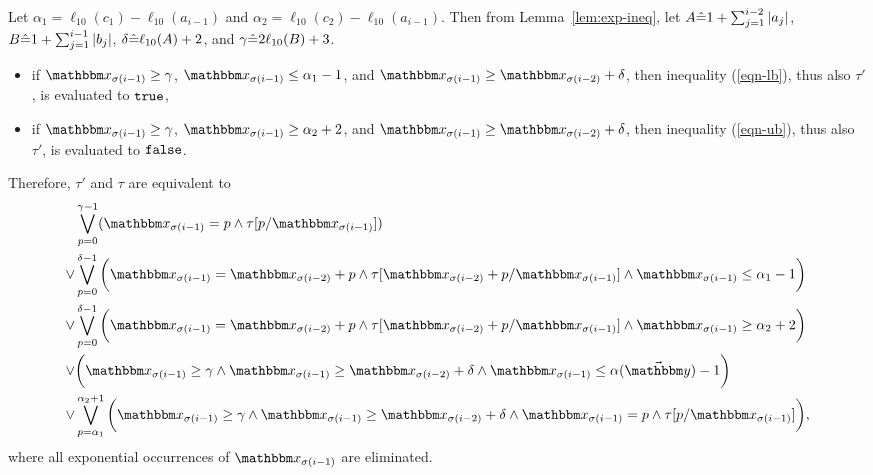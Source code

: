 Let $\alpha_1 = \ell_{10}(c_1) -  \ell_{10}(a_{i-1})$ and $\alpha_2 = \ell_{10}(c_2) -  \ell_{10}(a_{i-1})$. Then from Lemma~\ref{lem:exp-ineq}, let $A\hat{=} 1+\sum_{j=1}^{i-2}\vert a_j\vert$, 
$B \hat{=} 1+\sum_{j=1}^{i-1}\vert b_j\vert$, 
$\delta\hat{=}  \ell_{10}(A)+2$,
and $\gamma \hat{=} 2\ell_{10}(B)+3$. 
\begin{itemize}
\item if $\ivarx_{\sigma(i-1)} \ge \gamma$, $\ivarx_{\sigma(i-1)} \le \alpha_1 - 1$, and $\ivarx_{\sigma(i-1)} \ge \ivarx_{\sigma(i-2)} + \delta$, then inequality (\ref{eqn-lb}), thus also $\tau'$, is evaluated to $\mathtt{true}$,
\item if $\ivarx_{\sigma(i-1)} \ge \gamma$, $\ivarx_{\sigma(i-1)} \ge \alpha_2 + 2$, and $\ivarx_{\sigma(i-1)} \ge \ivarx_{\sigma(i-2)} + \delta$, then inequality (\ref{eqn-ub}), thus also $\tau'$, is evaluated to $\mathtt{false}$.
\end{itemize}

Therefore, $\tau'$ and $\tau$ are equivalent to 
\begin{equation}\label{lemma-example}\begin{aligned}
    &\bigvee_{p=0}^{\gamma-1} (\ivarx_{\sigma(i-1)}=p \wedge \tau[p/\ivarx_{\sigma(i-1)}])\\
    \vee &\bigvee_{p=0}^{\delta-1} \bigg(\ivarx_{\sigma(i-1)}=\ivarx_{\sigma(i-2)}+p\wedge \tau[\ivarx_{\sigma(i-2)}+p/\ivarx_{\sigma(i-1)}]\wedge \ivarx_{\sigma(i-1)}\le \alpha_1-1\bigg)\\
    \vee &\bigvee_{p=0}^{\delta-1} \bigg(\ivarx_{\sigma(i-1)}=\ivarx_{\sigma(i-2)}+p\wedge \tau[\ivarx_{\sigma(i-2)}+p/\ivarx_{\sigma(i-1)}]\wedge \ivarx_{\sigma(i-1)}\ge \alpha_2+2\bigg)\\
    \vee & \bigg( \ivarx_{\sigma(i-1)}\ge \gamma \wedge \ivarx_{\sigma(i-1)} \ge \ivarx_{\sigma(i-2)}+\delta \wedge \ivarx_{\sigma(i-1)}\le \alpha(\vec\ivary)-1\bigg)\\
    \vee & \bigvee_{p=\alpha_1}^{\alpha_2+1} \bigg( \ivarx_{\sigma(i-1)}\ge \gamma \wedge \ivarx_{\sigma(i-1)} \ge \ivarx_{\sigma(i-2)}+\delta \wedge \ivarx_{\sigma(i-1)} = p \wedge \tau[p/\ivarx_{\sigma(i-1)}]\bigg),
\end{aligned}\end{equation}
where all exponential occurrences of $\ivarx_{\sigma(i-1)}$ are eliminated.

